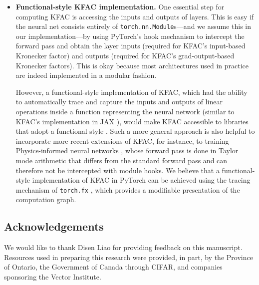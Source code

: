 \begin{itemize}
\item \textbf{Functional-style KFAC implementation.}
  One essential step for computing KFAC is accessing the inputs and outputs of layers.
  This is easy if the neural net consists entirely of \texttt{torch.nn.Module}s---and we assume this in our implementation---by using PyTorch's hook mechanism to intercept the forward pass and obtain the layer inputs (required for KFAC's input-based Kronecker factor) and outputs (required for KFAC's grad-output-based Kronecker factors).
  This is okay because most architectures used in practice are indeed implemented in a modular fashion.

  However, a functional-style implementation of KFAC, which had the ability to automatically trace and capture the inputs and outputs of linear operations inside a function representing the neural network (similar to KFAC's implementation in JAX \cite{botev2022kfac-jax}), would make KFAC accessible to libraries that adopt a functional style \citep[\eg][]{duffield2025scalable}.
  Such a more general approach is also helpful to incorporate more recent extensions of KFAC, for instance, to training Physics-informed neural networks \cite{dangel2024kroneckerfactored}, whose forward pass is done in Taylor mode arithmetic that differs from the standard forward pass and can therefore not be intercepted with module hooks.
  We believe that a functional-style implementation of KFAC in PyTorch can be achieved using the tracing mechanism of \texttt{torch.fx} \cite{reed2022torch}, which provides a modifiable presentation of the computation graph.
\end{itemize}

\subsection*{Acknowledgements}
We would like to thank Disen Liao for providing feedback on this manuscript.
Resources used in preparing this research were provided, in part, by the Province of Ontario, the Government of Canada through CIFAR, and companies sponsoring the Vector Institute.

